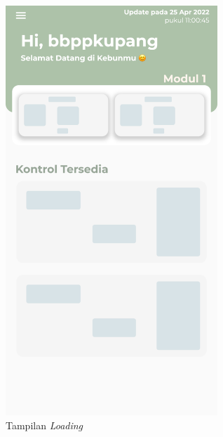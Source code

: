 \begin{flushleft}
\begin{justify}
\begin{enumerate}
\begin{itemize}
\begin{figure}[ht]
                    \includegraphics[width=8cm]{images/bab 4/ui-loading.png}
                    \caption{Tampilan \emph{Loading}}
                \end{figure}


\end{itemize}
\end{enumerate}
\end{justify}
\end{flushleft}
